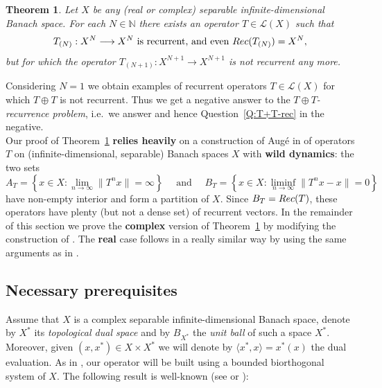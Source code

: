 \documentclass[openright,11pt]{article}
\theoremstyle{plain}
\newtheorem{theorem}{Theorem}[section]
\theoremstyle{definition}
\newcommand{\NN}{\mathbb{N}}
\newcommand{\Lc}{\mathcal{L}}
\newcommand{\Rec}{\textup{Rec}}
\newcommand{\ep}[2]{\langle #1 , #2 \rangle}
\begin{document}
\begin{theorem}\label{The:N-counter-example}
	Let $X$ be any (real or complex) separable infinite-dimensional Banach space. For each $N \in \NN$ there exists an operator $T \in \Lc(X)$ such that
	\[
	T_{(N)}:X^N\longrightarrow X^N \text{ is recurrent, and even } \Rec(T_{(N)})=X^N,
	\]
	but for which the operator $T_{(N+1)}:X^{N+1}\longrightarrow X^{N+1}$ is not recurrent any more.
\end{theorem}

Considering $N=1$ we obtain examples of recurrent operators $T \in \Lc(X)$ for which $T\oplus T$ is not recurrent. Thus we get a negative answer to the {\em $T\oplus T$-recurrence problem}, i.e.\ we answer \cite[Question~9.6]{CoMaPa2014} and hence Question~\ref{Q:T+T-rec} in the negative.\\[-5pt]

Our proof of Theorem~\ref{The:N-counter-example} \textbf{relies heavily} on a construction of Aug\'e in \cite{Auge2012} of operators $T$ on (infinite-dimensional, separable) Banach spaces $X$ with \textbf{wild dynamics}: the two sets
\[
A_T = \left\{ x \in X : \lim_{n\to\infty} \|T^nx\| = \infty \right\} \quad \text{ and } \quad B_T = \left\{ x \in X : \liminf_{n\to\infty} \|T^nx-x\|=0 \right\}
\]
have non-empty interior and form a partition of $X$. Since $B_T=\Rec(T)$, these operators have plenty (but not a dense set) of recurrent vectors. In the remainder of this section we prove the \textbf{complex} version of Theorem~\ref{The:N-counter-example} by modifying the construction of \cite{Auge2012}. The \textbf{real} case follows in a really similar way by using the same arguments as in \cite[Section~3.2]{Auge2012}.

\subsection{Necessary prerequisites}

Assume that $X$ is a complex separable infinite-dimensional Banach space, denote by $X^*$ its {\em topological dual space} and by $B_{X^*}$ the {\em unit ball} of such a space $X^*$. Moreover, given $(x,x^*) \in X\times X^*$ we will denote by $\ep{x^*}{x} = x^*(x)$ the dual evaluation. As in \cite{Auge2012}, our operator will be built using a bounded biorthogonal  system of $X$. The following result is well-known (see \cite[Vol I, Section 1.f]{LindTzaf1977_book} or \cite{OvsPel}):
\end{document}
